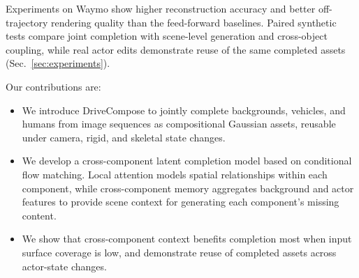 Experiments on Waymo show higher reconstruction accuracy and better off-trajectory rendering quality than the feed-forward baselines. Paired synthetic tests compare joint completion with scene-level generation and cross-object coupling, while real actor edits demonstrate reuse of the same completed assets (Sec.~\ref{sec:experiments}).

Our contributions are:
\begin{itemize}
\item We introduce DriveCompose to jointly complete backgrounds, vehicles, and humans from image sequences as compositional Gaussian assets, reusable under camera, rigid, and skeletal state changes.
\item We develop a cross-component latent completion model based on conditional flow matching. Local attention models spatial relationships within each component, while cross-component memory aggregates background and actor features to provide scene context for generating each component's missing content.
\item We show that cross-component context benefits completion most when input surface coverage is low, and demonstrate reuse of completed assets across actor-state changes.
\end{itemize}

